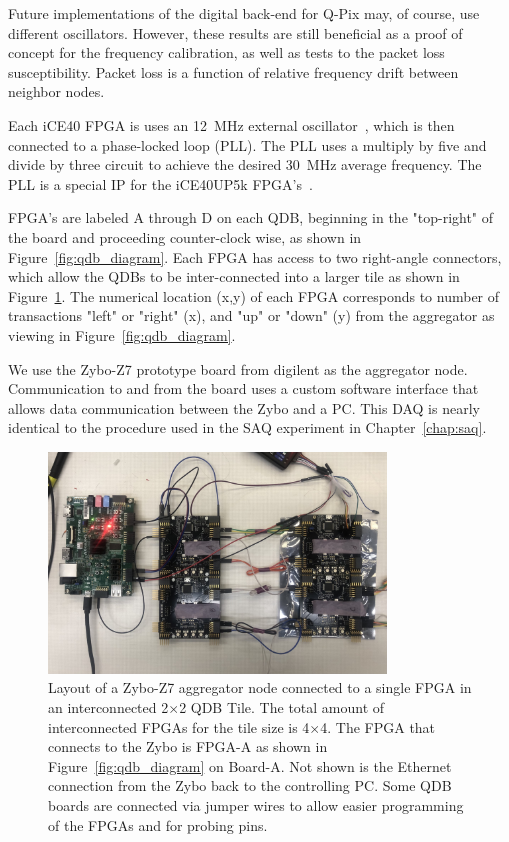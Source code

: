 Future implementations of the digital back-end for Q-Pix may, of course, use different oscillators.
However, these results are still beneficial as a proof of concept for the frequency calibration, as well as tests to the packet loss susceptibility.
Packet loss is a function of relative frequency drift between neighbor nodes.

Each iCE40 FPGA is uses an 12~\unit{MHz} external oscillator~\citep{ecs1612mv}, which is then connected to a phase-locked loop (PLL).
The PLL uses a multiply by five and divide by three circuit to achieve the desired 30~\unit{MHz} average frequency.
The PLL is a special IP for the iCE40UP5k FPGA's~\citep{latticeice40up}.

FPGA's are labeled A through D on each QDB, beginning in the "top-right" of the board and proceeding counter-clock wise, as shown in Figure~\ref{fig:qdb_diagram}.
Each FPGA has access to two right-angle connectors, which allow the QDBs to be inter-connected into a larger tile as shown in Figure~\ref{fig:qdb_test_setup}.
The numerical location (x,y) of each FPGA corresponds to number of transactions "left" or "right" (x), and "up" or "down" (y) from the aggregator as viewing in Figure~\ref{fig:qdb_diagram}.

We use the Zybo-Z7 prototype board from digilent as the aggregator node.
Communication to and from the board uses a custom software interface that allows data communication between the Zybo and a PC.
This DAQ is nearly identical to the procedure used in the SAQ experiment in Chapter~\ref{chap:saq}.

\begin{figure}[]
\centering
\includegraphics[width=0.8\textwidth]{./images/qdb_frequency_test_setup.jpg}
\caption{Layout of a Zybo-Z7 aggregator node connected to a single FPGA in an interconnected 2$\times$2 QDB Tile.
The total amount of interconnected FPGAs for the tile size is 4$\times$4.
The FPGA that connects to the Zybo is FPGA-A as shown in Figure~\ref{fig:qdb_diagram} on Board-A.
Not shown is the Ethernet connection from the Zybo back to the controlling PC.
Some QDB boards are connected via jumper wires to allow easier programming of the FPGAs and for probing pins.
}
\label{fig:qdb_test_setup}
\end{figure}

